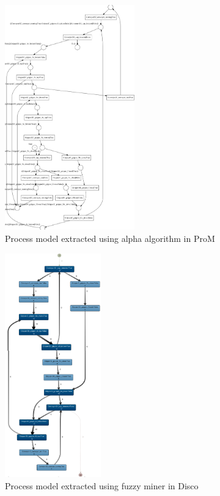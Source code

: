 \begin{bibunit}
   \begin{figure}[!t]
	   \centering
	   \includegraphics[width=0.5\textwidth]{MX_Papers/Paper5/images/PN.PNG}
	   \caption{Process model extracted using alpha algorithm in ProM}
	   \label{fig:PN}
   \end{figure}
   
   \begin{figure}[!t]
	   \centering
	   \includegraphics[width=0.37\textwidth]{MX_Papers/Paper5/images/disco.png}
	   \caption{Process model extracted using fuzzy miner in Disco}
	   \label{fig:fm}
   \end{figure}
   

\end{bibunit}
